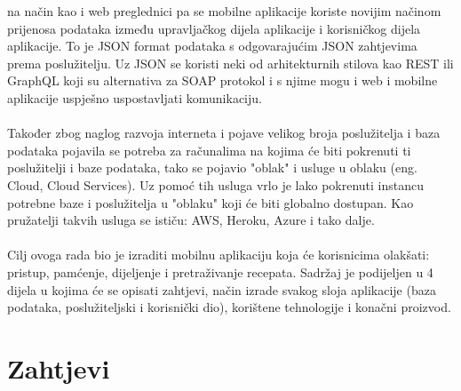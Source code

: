 \documentclass[times, utf8, zavrsni]{fer}
\begin{document}
na način kao i web preglednici pa se mobilne aplikacije koriste novijim načinom prijenosa
podataka između upravljačkog dijela aplikacije i korisničkog dijela aplikacije.
To je JSON format podataka s odgovarajućim JSON zahtjevima prema poslužitelju.
Uz JSON se koristi neki od arhitekturnih stilova kao REST ili GraphQL koji su alternativa
za SOAP protokol i s njime mogu i web i mobilne aplikacije uspješno uspostavljati komunikaciju.
\\\\
Također zbog naglog razvoja interneta i pojave velikog broja poslužitelja i baza podataka
pojavila se potreba za računalima na kojima će biti pokrenuti ti poslužitelji i
baze podataka, tako se pojavio "oblak" i usluge u oblaku (eng. Cloud, Cloud Services).
Uz pomoć tih usluga vrlo je lako pokrenuti instancu potrebne baze i poslužitelja
u "oblaku" koji će biti globalno dostupan. Kao pružatelji takvih usluga se ističu:
AWS, Heroku, Azure i tako dalje.
\\\\
Cilj ovoga rada bio je izraditi mobilnu aplikaciju koja će korisnicima olakšati: pristup,
pamćenje, dijeljenje i pretraživanje recepata. Sadržaj je podijeljen u 4 dijela u kojima
će se opisati zahtjevi, način izrade svakog sloja aplikacije (baza podataka,
poslužiteljski i korisnički dio), korištene tehnologije i konačni proizvod.

\chapter{Zahtjevi}
\end{document}
